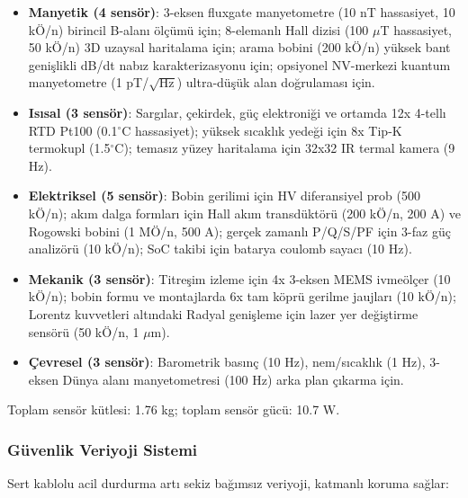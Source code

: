 \begin{itemize}
    \item \textbf{Manyetik (4 sensör)}: 3-eksen fluxgate manyetometre (10 nT hassasiyet, 10 kÖ/n) birincil B-alanı ölçümü için; 8-elemanlı Hall dizisi (100 $\mu$T hassasiyet, 50 kÖ/n) 3D uzaysal haritalama için; arama bobini (200 kÖ/n) yüksek bant genişlikli dB/dt nabız karakterizasyonu için; opsiyonel NV-merkezi kuantum manyetometre (1 pT/$\sqrt{\text{Hz}}$) ultra-düşük alan doğrulaması için.
    \item \textbf{Isısal (3 sensör)}: Sargılar, çekirdek, güç elektroniği ve ortamda 12x 4-tellı RTD Pt100 (0.1$^\circ$C hassasiyet); yüksek sıcaklık yedeği için 8x Tip-K termokupl (1.5$^\circ$C); temasız yüzey haritalama için 32x32 IR termal kamera (9 Hz).
    \item \textbf{Elektriksel (5 sensör)}: Bobin gerilimi için HV diferansiyel prob (500 kÖ/n); akım dalga formları için Hall akım transdüktörü (200 kÖ/n, 200 A) ve Rogowski bobini (1 MÖ/n, 500 A); gerçek zamanlı P/Q/S/PF için 3-faz güç analizörü (10 kÖ/n); SoC takibi için batarya coulomb sayacı (10 Hz).
    \item \textbf{Mekanik (3 sensör)}: Titreşim izleme için 4x 3-eksen MEMS ivmeölçer (10 kÖ/n); bobin formu ve montajlarda 6x tam köprü gerilme jaujları (10 kÖ/n); Lorentz kuvvetleri altındaki Radyal genişleme için lazer yer değiştirme sensörü (50 kÖ/n, 1 $\mu$m).
    \item \textbf{Çevresel (3 sensör)}: Barometrik basınç (10 Hz), nem/sıcaklık (1 Hz), 3-eksen Dünya alanı manyetometresi (100 Hz) arka plan çıkarma için.
\end{itemize}

Toplam sensör kütlesi: 1.76 kg; toplam sensör gücü: 10.7 W.

\subsubsection{Güvenlik Veriyoji Sistemi}

Sert kablolu acil durdurma artı sekiz bağımsız veriyoji, katmanlı koruma sağlar:

